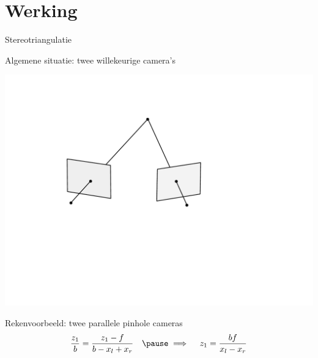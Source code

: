 \section{Werking}
\begin{frame}{Stereotriangulatie}

{\large Algemene situatie: twee willekeurige camera's}

\centerline{\includegraphics[scale=0.4, clip=true, viewport= 120 230 470 470]{triang}}
\vfill
\pause
{\large Rekenvoorbeeld: twee parallele pinhole cameras}
\pause
$$
\frac{z_1}{b} = \frac{z_1 - f}{b-x_l+x_r}\quad \pause\implies\quad z_1 = \frac {bf} {x_l - x_r}
$$
\end{frame}

